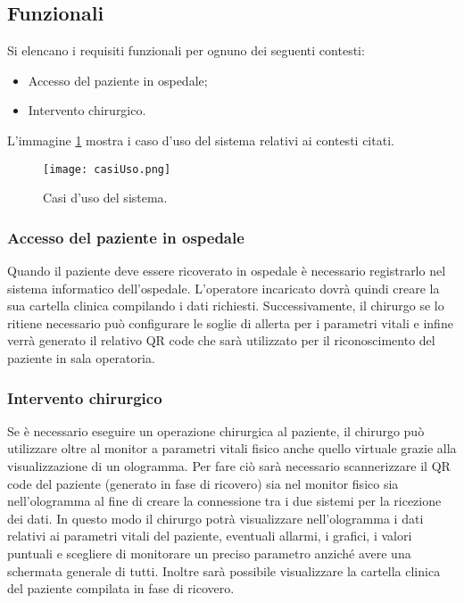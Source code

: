 \subsection{Funzionali}
Si elencano i requisiti funzionali per ognuno dei seguenti contesti:

\begin{itemize}
    \item Accesso del paziente in ospedale;
    \item Intervento chirurgico.
\end{itemize}

L'immagine \ref{pic:use-cases} mostra i caso d'uso del sistema relativi ai contesti citati.

\begin{figure}[ht]
    \texttt{[image: casiUso.png]}
    \centering
    \caption{\label{pic:use-cases}Casi d'uso del sistema.}
\end{figure}

\subsubsection{Accesso del paziente in ospedale}
Quando il paziente deve essere ricoverato in ospedale è necessario registrarlo nel sistema informatico dell'ospedale. L'operatore incaricato dovrà quindi creare la sua cartella clinica compilando i dati richiesti. Successivamente, il chirurgo se lo ritiene necessario può configurare le soglie di allerta per i parametri vitali e infine verrà generato il relativo QR code che sarà utilizzato per il riconoscimento del paziente in sala operatoria.

\subsubsection{Intervento chirurgico}
Se è necessario eseguire un operazione chirurgica al paziente, il chirurgo può utilizzare oltre al monitor a parametri vitali fisico anche quello virtuale grazie alla visualizzazione di un ologramma. Per fare ciò sarà necessario scannerizzare il QR code del paziente (generato in fase di ricovero) sia nel monitor fisico sia nell'ologramma al fine di creare la connessione tra i due sistemi per la ricezione dei dati. In questo modo il chirurgo potrà visualizzare nell'ologramma i dati relativi ai parametri vitali del paziente, eventuali allarmi, i grafici, i valori puntuali e scegliere di monitorare un preciso parametro anziché avere una schermata generale di tutti. Inoltre sarà possibile visualizzare la cartella clinica del paziente compilata in fase di ricovero.

